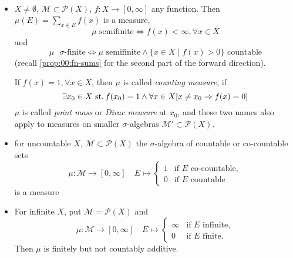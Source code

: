 \begin{exa}\
  \begin{itemize}
  \item ${X\neq\emptyset}$, ${\mathcal{M}\subset\mathscr{P}(X)}$,
    ${f: X\rightarrow[0,\infty]}$ any function.
    Then ${\mu(E)=\sum_{x\in E} f(x)}$ is a measure,
    \[ \mu\text{ semifinite}\iff f(x)<\infty,\forall x\in X \]
    and
    \[
    \mu\text{ $\sigma$-finite}\iff
    \mu\text{ semifinite} \land
    \{x\in X\mid f(x)>0\} \text{ countable}
    \]
    (recall \ref{prop:00:fn-sums} for the second part of the
    forward direction).

    If ${f(x)=1,\forall x\in X}$, then $\mu$ is called
    \emph{counting measure},
    if
    \[
    \exists x_0\in X\operatorname{\,st.} f(x_0)=1 \land
    \forall x\in X[x\neq x_0\Rightarrow f(x)=0]
    \]
    $\mu$ is called \emph{point mass} or \emph{Dirac measure} at $x_0$,
    and these two names also apply to measures on smaller
    $\sigma$-algebras ${\mathcal{M}'\subset\mathscr{P}(X)}$.
  \item for uncountable $X$, ${\mathcal{M}\subset\mathscr{P}(X)}$
    the $\sigma$-algebra of countable or co-countable sets
    \[
    \mu: \mathcal{M}\rightarrow[0,\infty]\quad
    E\mapsto\left\{
    \begin{array}{rl}
      1 & \text{if $E$ co-countable},\\
      0 & \text{if $E$ countable}
    \end{array}
    \right.
    \]
    is a measure
  \item For infinite $X$, put ${\mathcal{M}=\mathscr{P}(X)}$ and
    \[
    \mu: \mathcal{M}\rightarrow[0,\infty]\quad
    E\mapsto\left\{
    \begin{array}{rl}
      \infty & \text{if $E$ infinite},\\
      0 & \text{if $E$ finite}.
    \end{array}
    \right.
    \]
    Then $\mu$ is finitely but not countably additive.
  \end{itemize}
\end{exa}


